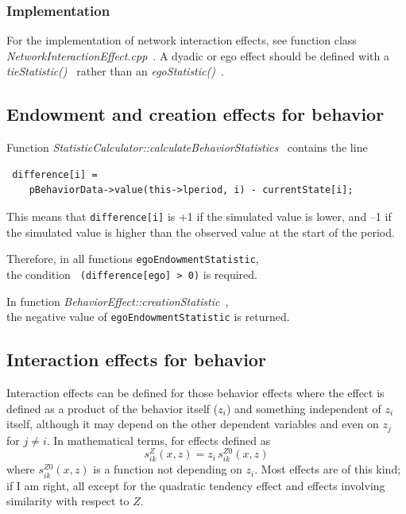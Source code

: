 \documentclass[a4paper,12pt,fleqn]{article}
\newcommand{\nnm}[1]{\textsf{\small\textit{#1}\ }}
\begin{document}
\subsubsection{Implementation}

For the implementation of network interaction effects, see function class
\nnm{NetworkInteractionEffect.cpp}.
A dyadic or ego effect should be defined with a \nnm{tieStatistic()}
rather than an \nnm{egoStatistic()}.


\subsection{Endowment and creation effects for behavior}

Function \nnm{StatisticCalculator::calculateBehaviorStatistics} contains the line
\begin{verbatim}
 difference[i] =
	pBehaviorData->value(this->lperiod, i) - currentState[i];
\end{verbatim}
This means that \texttt{difference[i]} is +1 if the simulated value is lower,
and --1 if the simulated value is higher than the observed value at the
start of the period.

Therefore, in all functions \texttt{egoEndowmentStatistic},\\
the condition \texttt{ (difference[ego] > 0)} is required.

In function \nnm{BehaviorEffect::creationStatistic}, \\
the negative value
of \texttt{egoEndowmentStatistic} is returned.


\subsection{Interaction effects for behavior}

Interaction effects can be defined for those behavior effects
where the effect is defined as a product of the behavior itself ($z_i$)
and something independent of $z_i$ itself, although it may depend
on the other dependent variables and even on $z_j$ for $j \neq i$. In mathematical
terms, for effects defined as
\begin{equation}
  s_{ik}^Z(x,z) = z_i\, s_{ik}^{Z0}(x,z)   \label{beh_eff_standard}
\end{equation}
where $s_{ik}^{Z0}(x,z)$ is a function not depending on $z_i$.
Most effects are of this kind;
if I am right, all except for the quadratic tendency effect
and effects involving similarity with respect to $Z$.
\end{document}
